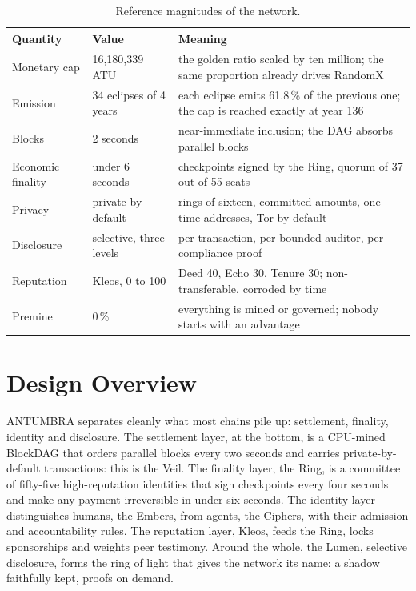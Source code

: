 \begin{table}[htbp]
\centering
\small
\caption{Reference magnitudes of the network.}
\label{tab:magnitudes}
\begin{tabularx}{\textwidth}{@{}L{3.6cm}L{4.4cm}Y@{}}
\toprule
Quantity & Value & Meaning \\
\midrule
Monetary cap & 16,180,339 ATU & the golden ratio scaled by ten million; the same proportion already drives RandomX \\
Emission & 34 eclipses of 4 years & each eclipse emits 61.8\,\% of the previous one; the cap is reached exactly at year 136 \\
Blocks & 2 seconds & near-immediate inclusion; the DAG absorbs parallel blocks \\
Economic finality & under 6 seconds & checkpoints signed by the Ring, quorum of 37 out of 55 seats \\
Privacy & private by default & rings of sixteen, committed amounts, one-time addresses, Tor by default \\
Disclosure & selective, three levels & per transaction, per bounded auditor, per compliance proof \\
Reputation & Kleos, 0 to 100 & Deed 40, Echo 30, Tenure 30; non-transferable, corroded by time \\
Premine & 0\,\% & everything is mined or governed; nobody starts with an advantage \\
\bottomrule
\end{tabularx}
\end{table}

\section{Design Overview}\label{sec:overview}

ANTUMBRA separates cleanly what most chains pile up: settlement, finality,
identity and disclosure. The settlement layer, at the bottom, is a
CPU-mined BlockDAG that orders parallel blocks every two seconds and
carries private-by-default transactions: this is the Veil. The finality
layer, the Ring, is a committee of fifty-five high-reputation identities
that sign checkpoints every four seconds and make any payment irreversible
in under six seconds. The identity layer distinguishes humans, the Embers,
from agents, the Ciphers, with their admission and accountability rules.
The reputation layer, Kleos, feeds the Ring, locks sponsorships and weights
peer testimony. Around the whole, the Lumen, selective disclosure, forms
the ring of light that gives the network its name: a shadow faithfully
kept, proofs on demand.

